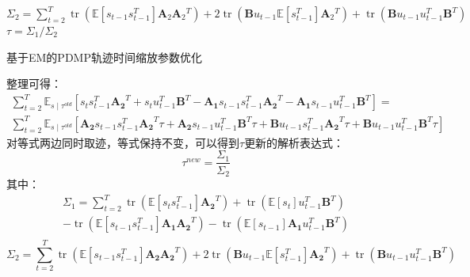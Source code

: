 \begin{algorithm}[htb]
{{{            $\Sigma_2=\sum_{t=2}^T \operatorname{tr}\left(\mathbb{E}\left[s_{t-1} s_{t-1}^T\right] \mathbf{A}_2 \mathbf{A}_2{ }^T\right)+2 \operatorname{tr}\left(\mathbf{B} u_{t-1} \mathbb{E}\left[s_{t-1}^T\right] \mathbf{A}_2{ }^T\right)+\operatorname{tr}\left(\mathbf{B} u_{t-1} u_{t-1}^T \mathbf{B}^T\right)$
        }
        $\tau=\Sigma_1 / \Sigma_2$ \;
      }
    }
    \caption{基于EM的PDMP轨迹时间缩放参数优化}
    \label{algo:4-1}
\end{algorithm}
整理可得：
\begin{equation}
    \begin{gathered}
    \sum_{t=2}^T \mathbb{E}_{s \mid \tau^{old}}\left[s_ts_{t-1}^T\mathbf{A_2}^T + s_tu_{t-1}^T\mathbf{B}^T -\mathbf{A_1}s_{t-1}s_{t-1}^T\mathbf{A_2}^T - \mathbf{A_1}s_{t-1}u_{t-1}^T\mathbf{B}^T\right] = \\ 
    \sum_{t=2}^T \mathbb{E}_{s \mid \tau^{old}}\left[\mathbf{A_2}s_{t-1}s_{t-1}^T\mathbf{A_2}^T\tau +\mathbf{A_2}s_{t-1}u_{t-1}^T\mathbf{B}^T\tau + \mathbf{B}u_{t-1}s_{t-1}^T\mathbf{A_2}^T\tau +\mathbf{B}u_{t-1}u_{t-1}^T\mathbf{B}^T\tau\right]
    \end{gathered}
    \label{eq:4-32}
\end{equation}
对等式两边同时取迹，等式保持不变，可以得到$\tau$更新的解析表达式：
\begin{equation}
    \tau^{new} = \frac{\Sigma_1}{\Sigma_2}
    \label{eq:4-33}
\end{equation}
其中：
\begin{equation}
    \begin{gathered}
    \Sigma_1  = \sum_{t=2}^T \operatorname{tr}\left(\mathbb{E}\left[s_ts_{t-1}^T\right]\mathbf{A_2}^T\right) + \operatorname{tr}\left(\mathbb{E}\left[s_t\right]u_{t-1}^T\mathbf{B}^T\right) \\- \operatorname{tr}\left(\mathbb{E}\left[s_{t-1}s_{t-1}^T\right]\mathbf{A_1}\mathbf{A_2}^T\right) - \operatorname{tr}\left(\mathbb{E}\left[s_{t-1}\right]\mathbf{A_1}u_{t-1}^T\mathbf{B}^T\right) \\
    \end{gathered}
    \label{eq:4-34}
\end{equation}
\begin{equation}
    \Sigma_2  = \sum_{t=2}^T \operatorname{tr}\left(\mathbb{E}\left[s_{t-1}s_{t-1}^T\right]\mathbf{A_2}\mathbf{A_2}^T\right) + 2 \operatorname{tr}\left(\mathbf{B}u_{t-1}\mathbb{E}\left[s_{t-1}^T\right]\mathbf{A_2}^T\right) +\operatorname{tr}\left(\mathbf{B}u_{t-1}u_{t-1}^T\mathbf{B}^T\right)
    \label{eq:4-35}
\end{equation}

